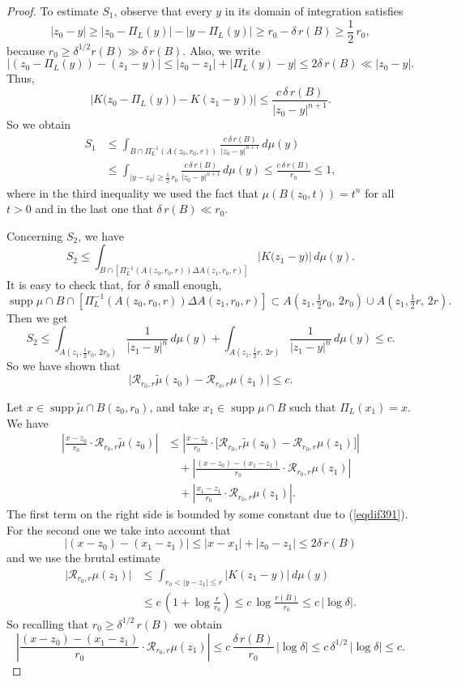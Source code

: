 \documentclass[11pt]{amsart}
\newcommand{\RR}{{\mathcal R}}
\newcommand{\rf}[1]{{(\ref{#1})}}
\newcommand{\supp}{\operatorname{supp}}
\newcommand{\wt}[1]{{\widetilde{#1}}}
\theoremstyle{definition}
\theoremstyle{remark}
\numberwithin{equation}{section}
\begin{document}
\begin{proof}
To estimate $S_1$, observe that every $y$ in its domain of integration satisfies
$$|z_0-y|\geq |z_0-\Pi_L(y)| - |y-\Pi_L(y)|\geq r_0 - \delta\,r(B)\geq \frac12 \,r_0,$$
because $r_0\geq\delta^{1/2}r(B)\gg \delta\,r(B)$.
Also, we write
$$\bigl|(z_0-\Pi_L(y)) - (z_1-y)\bigr| \leq |z_0-z_1| + |\Pi_L(y)-y| \leq 2\delta\,r(B)
\ll |z_0-y|.
$$
Thus,
$$\bigl|K\bigl(z_0-\Pi_L(y)\bigr) - K(z_1-y))\bigr| \leq \frac{c\,\delta\,r(B)}{|z_0-y|^{n+1}}.$$
So we obtain
\begin{align*}
S_1& \leq \int_{B\cap \Pi_L^{-1}(A(z_0,r_0,r))}\frac{c\,\delta\,r(B)}{|z_0-y|^{n+1}}\,d\mu(y)\\
& \leq \int_{|y-z_0|\geq \frac12\,r_0}\frac{c\,\delta\,r(B)}{|z_0-y|^{n+1}}\,d\mu(y)
\leq \frac{c\,\delta\,r(B)}{r_0}\leq 1,
\end{align*}
where in the third inequality we used the fact that $\mu(B(z_0,t))=t^n$ for all $t>0$ and in the last one that $\delta\,r(B)\ll r_0$.

Concerning $S_2$, we have
$$S_2 \leq \int_{B\cap \left[\Pi_L^{-1}(A(z_0,r_0,r)) \Delta A(z_1,r_0,r)\right]}\bigl|K\bigl(z_1-y)\bigr|\,d\mu(y).$$
It is easy to check that, for $\delta$ small enough,
$$\supp\mu\cap B\cap \left[\Pi_L^{-1}(A(z_0,r_0,r)) \Delta A(z_1,r_0,r)\right] \subset
A(z_1,\tfrac12 r_0,\,2r_0) \cup  A(z_1,\tfrac12 r,\,2r).$$
Then we get
$$S_2 \leq  \int_{A(z_1,\tfrac12 r_0,\,2r_0)}\frac1{|z_1-y|^n}\,d\mu(y) + \int_{A(z_1,\tfrac12 r,\,2r)} \frac1{|z_1-y|^n}\,d\mu(y)
\leq c.$$
So we have shown that 
\begin{equation}\label{eqdif391}
\bigl|\RR_{r_0,r}\wt\mu(z_0) - \RR_{r_0,r}\mu(z_1)\bigr|\leq c.
\end{equation}

Let $x\in\supp\wt\mu \cap B(z_0,r_0)$, and take $x_1\in \supp\mu \cap B$ such that $\Pi_L(x_1)=x$. We have
\begin{align}\label{eq3tt}
\left|\frac{x-z_0}{r_0}\cdot\RR_{r_0,r}\wt \mu(z_0)\right|& \leq 
\left|\frac{x-z_0}{r_0}\cdot\bigl[\RR_{r_0,r}\wt \mu(z_0) - \RR_{r_0,r}\mu(z_1)\bigr]\right|\nonumber \\
&\quad 
+ \left|\frac{(x-z_0)-(x_1-z_1)}{r_0}\cdot\RR_{r_0,r}\mu(z_1)\right|\nonumber\\
&\quad + \left|\frac{x_1-z_1}{r_0}\cdot\RR_{r_0,r}\mu(z_1)\right|
.
\end{align}
The first term on the right side is bounded by some constant due to \rf{eqdif391}.
For the second one we take into account that
\begin{equation}\label{eqdaq16}
\bigl|(x-z_0)-(x_1-z_1)\bigr| \leq |x-x_1|+ |z_0-z_1| \leq 2\delta\,r(B)
\end{equation}
and we use the brutal estimate
\begin{align*}
\bigl|\RR_{r_0,r}\mu(z_1)\bigr|& \leq \int_{r_0<|y-z_1|\leq r}|K(z_1-y)|\,d\mu(y)\\
& \leq c\,
\left(1+\log\frac {r}{r_0}\right)\leq c\,\log\frac {r(B)}{r_0} \leq c\,|\log\delta|.
\end{align*}
So recalling that $r_0\geq \delta^{1/2}\,r(B)$ we obtain
$$\left|\frac{(x-z_0)-(x_1-z_1)}{r_0}\cdot\RR_{r_0,r}\mu(z_1)\right|\leq c\,
\frac{\delta\,r(B)}{r_0} \,|\log\delta|\leq c\,
\delta^{1/2}\,|\log\delta|\leq c.$$


\end{proof}
\end{document}
